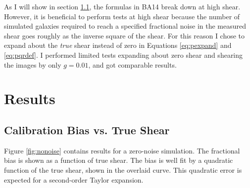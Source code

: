 \documentclass[usegraphicx,usenatbib]{mn2e}
\begin{document}
As I will show in section \ref{sec:truebias}, the formulas in BA14 break down
at high shear.  However, it is beneficial to perform tests at high shear
because the number of simulated galaxies required to reach a specified
fractional noise in the measured shear goes roughly as the inverse square of
the shear.  For this reason I chose to expand about the {\it true} shear
instead of zero in Equations \ref{eq:pexpand} and \ref{eq:pqrdef}.  I performed
limited tests expanding about zero shear and shearing the images by only $g=0.01$,
and got comparable results. 

\section{Results} \label{sec:results}

\subsection{Calibration Bias vs. True Shear} \label{sec:truebias}

Figure \ref{fig:nonoise} contains results for a zero-noise simulation.  The
fractional bias is shown as a function of true shear.  The bias is well fit by
a quadratic function of the true shear, shown in the overlaid curve. This
quadratic error is expected for a second-order Taylor expansion.
\end{document}
